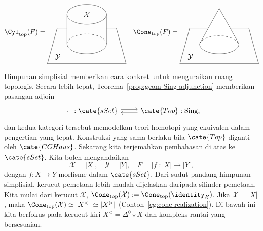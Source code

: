 \[ \Cyl_{\mathrm{top}}(F) = \begin{tikzpicture}[baseline=(O)]
	\draw (1, 1.5) ellipse[x radius=1, y radius=0.5] node {$\mathcal{X}$};
	\draw (0, 0) arc[start angle=180, end angle=360, x radius=1, y radius=0.5];
	\draw[dashed] (0, 0) arc[start angle=180, end angle=0, x radius=1, y radius=0.5];
	\draw (2, 1.5) -- (2, 0);
	\draw (0, 1.5) -- (0, 0);
	\draw (0, 0.8) -- (-0.5, 0.8) -- (-1, -1) node[xshift=1.5em,  yshift=1em] {$\mathcal{Y}$} -- (3, -1) -- (2.5, 0.8) -- (2, 0.8);
	\coordinate (O) at (0, 0.5);
\end{tikzpicture} \quad
	\Cone_{\mathrm{top}}(F) = \begin{tikzpicture}[baseline=(O)]
	\draw (0, 0.8) -- (-0.5, 0.8) -- (-1, -1) node[xshift=1.5em,  yshift=1em] {$\mathcal{Y}$} -- (3, -1) -- (2.5, 0.8) --cycle;
	\filldraw[fill=white] (1, 1.8) -- (0, 0) arc[start angle=180, end angle=360, x radius=1, y radius=0.5] --cycle;
	\draw[dashed] (0, 0) arc[start angle=170, end angle=10, x radius=1, y radius=0.5];
	\coordinate (O) at (0, 0.5);
\end{tikzpicture}\]

Himpunan simplisial memberikan cara konkret untuk menguraikan ruang
topologis. Secara lebih tepat, Teorema~\ref{prop:geom-Sing-adjunction}
memberikan pasangan adjoin
\[\begin{tikzcd}
	{|\cdot|}: \cate{sSet} \arrow[shift left, r] & \cate{Top}: \mathrm{Sing}, \arrow[shift left, l]
\end{tikzcd}\]
dan kedua kategori tersebut memodelkan teori homotopi yang ekuivalen dalam
pengertian yang tepat. Konstruksi yang sama berlaku bila $\cate{Top}$ diganti
oleh $\cate{CGHaus}$. Sekarang kita terjemahkan pembahasan di atas ke
$\cate{sSet}$. Kita boleh mengandaikan
\[ \mathcal{X} = |X|, \quad \mathcal{Y} = |Y|, \quad F = |f|: |X| \to |Y|, \]
dengan $f:X\to Y$ morfisme dalam $\cate{sSet}$. Dari sudut pandang
himpunan simplisial, kerucut pemetaan lebih mudah dijelaskan daripada
silinder pemetaan. Kita mulai dari kerucut $\mathcal{X}$,
$\Cone_{\mathrm{top}}(\mathcal{X}):=
\Cone_{\mathrm{top}}(\identity_{\mathcal{X}})$. Jika
$\mathcal{X}=|X|$, maka
$\Cone_{\mathrm{top}}(\mathcal{X})\simeq|X^{\lhd}|\simeq|X^{\rhd}|$
(Contoh~\ref{eg:cone-realization}). Di bawah ini kita berfokus pada
kerucut kiri $X^{\lhd}=\Delta^0\star X$ dan kompleks rantai yang
bersesuaian.

